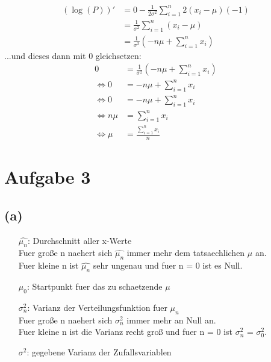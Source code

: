 \documentclass[a4paper]{scrartcl}
\begin{document}
\begin{align*}
	(\log(P))' &= 0 - \frac{1}{2\sigma^2}\sum_{i=1}^{n} 2(x_i-\mu)(-1)\\
	&= \frac{1}{\sigma^2}\sum_{i=1}^{n} (x_i-\mu)\\
	&= \frac{1}{\sigma^2}(- n\mu + \sum_{i=1}^{n} x_i)
\end{align*}
...und dieses dann mit 0 gleichsetzen:
\begin{align*}
	0 &= \frac{1}{\sigma^2}(- n\mu + \sum_{i=1}^{n} x_i)\\
	\Leftrightarrow 0 &=- n\mu + \sum_{i=1}^{n} x_i\\
	\Leftrightarrow 0 &= - n\mu + \sum_{i=1}^{n} x_i\\
	\Leftrightarrow n\mu &= \sum_{i=1}^{n} x_i\\
	\Leftrightarrow \mu &= \frac{\sum_{i=1}^{n} x_i}{n}
\end{align*}

\newpage
\section*{Aufgabe 3}

\subsection*{(a)}

\begin{itemize}
	\item[$\widehat{\mu_n}$:] Durchschnitt aller x-Werte\\
	Fuer große n naehert sich $\widehat{\mu_n}$ immer mehr dem tatsaechlichen $\mu$ an.\\
	Fuer kleine n ist $\widehat{\mu_n}$ sehr ungenau und fuer n = 0 ist es Null.\\
	\item[$\mu_0$:] Startpunkt fuer das zu schaetzende $\mu$
	\item[$\sigma_n^2$:] Varianz der Verteilungsfunktion fuer $\mu_n$\\
	Fuer große n naehert sich $\sigma_n^2$ immer mehr an Null an.\\
	Fuer kleine n ist die Varianz recht groß und fuer n = 0 ist $\sigma_n^2$ = $\sigma_0^2$. 
	\item[$\sigma^2$:] gegebene Varianz der Zufallsvariablen 
\end{itemize}
\end{document}
